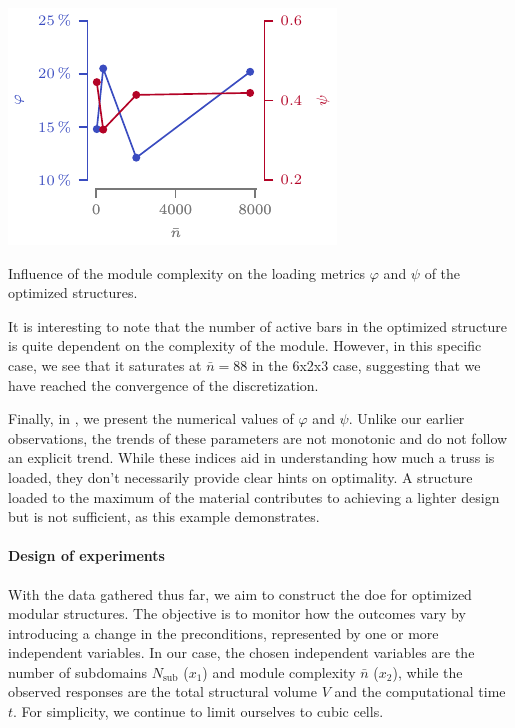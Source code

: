 \begin{marginfigure}
    \centering
    \includegraphics[width=\linewidth]{figures/05_cellular_opt/00_module_complexity_tab/comp_tab_param.pdf}
    \caption{Influence of the module complexity on the loading metrics $\varphi$ and $\psi$ of the optimized structures.}
    \label{fig:05_comp_param}
\end{marginfigure}

It is interesting to note that the number of active bars in the optimized structure is quite dependent on the complexity of the module. However, in this specific case, we see that it saturates at $\bar{n}=88$ in the 6x2x3 case, suggesting that we have reached the convergence of the discretization.

Finally, in , we present the numerical values of $\varphi$ and $\psi$. Unlike our earlier observations, the trends of these parameters are not monotonic and do not follow an explicit trend. While these indices aid in understanding how much a truss is loaded, they don't necessarily provide clear hints on optimality. A structure loaded to the maximum of the material contributes to achieving a lighter design but is not sufficient, as this example demonstrates.

\paragraph{Design of experiments}
With the data gathered thus far, we aim to construct the \gls{doe} for optimized modular structures. The objective is to monitor how the outcomes vary by introducing a change in the preconditions, represented by one or more independent variables. In our case, the chosen independent variables are the number of subdomains $N_\text{sub}$ ($x_1$) and module complexity $\bar{n}$ ($x_2$), while the observed responses are the total structural volume $V$ and the computational time $t$. For simplicity, we continue to limit ourselves to cubic cells.

